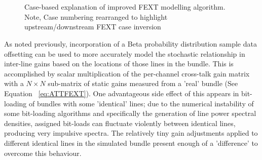 \begin{figure}[H]
 \\
 \\
 \caption{Case-based explanation of improved FEXT modelling algorithm. Note, Case numbering rearranged to highlight upstream/downstream FEXT case inversion}
\label{fig:FEXT-xtalk-gain}
\end{figure}

As noted previously, incorporation of a Beta probability distribution sample data offsetting can be used to more accurately model the stochastic relationship in inter-line gains based on the locations of those lines in the bundle. This is accomplished by scalar multiplication of the per-channel cross-talk gain matrix with a \(N\times N\) sub-matrix of static gains measured from a 'real' bundle (See Equation ~\ref{eq:ATTFEXT}). One advantageous side effect of this appears in bit-loading of bundles with some 'identical' lines; due to the numerical instability of some bit-loading algorithms and specifically the generation of line power spectral densities, assigned bit-loads can  fluctuate violently between identical lines, producing very impulsive spectra. The relatively tiny gain adjustments applied to different identical lines in the simulated bundle present enough of a 'difference' to overcome this behaviour.


